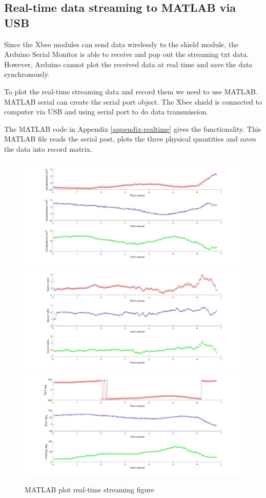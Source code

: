 \subsection{Real-time data streaming to MATLAB via USB}
Since the Xbee modules can send data wirelessly to the shield module, the Arduino Serial Monitor is able to receive and pop out the streaming txt data. However, Arduino cannot plot the received data at real time and save the data synchronously.

To plot the real-time streaming data and record them we need to use MATLAB\cite{manalo2012usb}. MATLAB serial can create the serial port object. The Xbee shield is connected to computer via USB and using serial port to do data transmission.

The MATLAB code in Appendix \ref{appendix-realtime} gives the functionality. This MATLAB file reads the serial post, plots the three physical quantities and saves the data into record matrix.       

\begin{figure}[H]
\centering
\includegraphics[width=\textwidth]{fig/DOE/acceleration}
\includegraphics[width=\textwidth]{fig/DOE/gyro}
\includegraphics[width=\textwidth]{fig/DOE/orientation}
\caption{MATLAB plot real-time streaming figure}
\end{figure}

